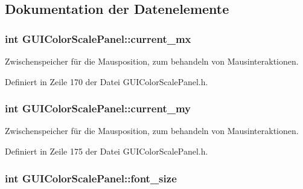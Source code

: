 \subsection{Dokumentation der Datenelemente}
\hypertarget{classGUIColorScalePanel_ab3da81e6c3cfb9122c0291584276a54d}{
\subsubsection[{current\-\_\-mx}]{\setlength{\rightskip}{0pt plus 5cm}int G\-U\-I\-Color\-Scale\-Panel\-::current\-\_\-mx\hspace{0.3cm}{\ttfamily [private]}}}\label{classGUIColorScalePanel_ab3da81e6c3cfb9122c0291584276a54d}


Zwischenspeicher für die Mausposition, zum behandeln von Mausinteraktionen. 



Definiert in Zeile 170 der Datei G\-U\-I\-Color\-Scale\-Panel.\-h.

\hypertarget{classGUIColorScalePanel_abb73679c805d8bcdd1ca0cb602887f84}{
\subsubsection[{current\-\_\-my}]{\setlength{\rightskip}{0pt plus 5cm}int G\-U\-I\-Color\-Scale\-Panel\-::current\-\_\-my\hspace{0.3cm}{\ttfamily [private]}}}\label{classGUIColorScalePanel_abb73679c805d8bcdd1ca0cb602887f84}


Zwischenspeicher für die Mausposition, zum behandeln von Mausinteraktionen. 



Definiert in Zeile 175 der Datei G\-U\-I\-Color\-Scale\-Panel.\-h.

\hypertarget{classGUIColorScalePanel_acd79c1dedc939040b03f54f21e78d72f}{
\subsubsection[{font\-\_\-size}]{\setlength{\rightskip}{0pt plus 5cm}int G\-U\-I\-Color\-Scale\-Panel\-::font\-\_\-size\hspace{0.3cm}{\ttfamily [private]}}}\label{classGUIColorScalePanel_acd79c1dedc939040b03f54f21e78d72f}


